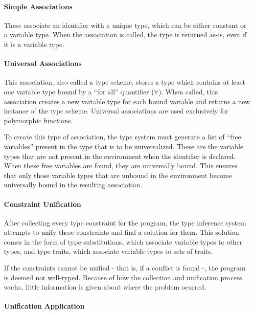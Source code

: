 \documentclass{article}
\begin{document}
\paragraph{Simple Associations}
These associate an identifier with a unique type, which can be either constant or a variable type.
When the association is called, the type is returned as-is, even if it is a variable type.

\paragraph{Universal Associations}
This association, also called a type scheme, stores a type which contains at least one variable type bound by a ``for all'' quantifier ($\forall$).
When called, this association creates a new variable type for each bound variable and returns a new instance of the type scheme.
Universal associations are used exclusively for polymorphic functions.

To create this type of association, the type system must generate a list of ``free variables'' present in the type that is to be universalized.
These are the variable types that are not present in the environment when the identifier is declared.
When these free variables are found, they are universally bound.
This ensures that only those variable types that are unbound in the environment become universally bound in the resulting association.

\paragraph{Constraint Unification}

After collecting every type constraint for the program, the type inference system attempts to unify these constraints and find a solution for them.
This solution comes in the form of type substitutions, which associate variable types to other types, and type traits, which associate variable types to sets of traits.

If the constraints cannot be unified - that is, if a conflict is found -, the program is deemed not well-typed.
Because of how the collection and unification process works, little information is given about where the problem ocurred.

\paragraph{Unification Application}
\end{document}
